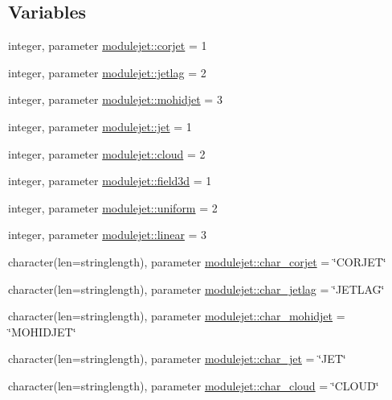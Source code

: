 \subsection*{Variables}
\begin{DoxyCompactItemize}
\item 
integer, parameter \mbox{\hyperlink{namespacemodulejet_a47f0eeeb3926639ae9bc14b922a7f57c}{modulejet\+::corjet}} = 1
\item 
integer, parameter \mbox{\hyperlink{namespacemodulejet_a0eac969bec0ab0471a9981f588069599}{modulejet\+::jetlag}} = 2
\item 
integer, parameter \mbox{\hyperlink{namespacemodulejet_a66d6965728ead70e0e7ec473e5f3892a}{modulejet\+::mohidjet}} = 3
\item 
integer, parameter \mbox{\hyperlink{namespacemodulejet_a40df7356ca4c8528a71bb58c601ebd49}{modulejet\+::jet}} = 1
\item 
integer, parameter \mbox{\hyperlink{namespacemodulejet_a9e881f4c022dfb8c88bf0a80253f418d}{modulejet\+::cloud}} = 2
\item 
integer, parameter \mbox{\hyperlink{namespacemodulejet_afc8a4f2043befe1347d4c124fa51f8fe}{modulejet\+::field3d}} = 1
\item 
integer, parameter \mbox{\hyperlink{namespacemodulejet_aded2b1f058efa2a87b81b1014237d1dd}{modulejet\+::uniform}} = 2
\item 
integer, parameter \mbox{\hyperlink{namespacemodulejet_a348a978ca201c1b1d5cce70caf9ffbca}{modulejet\+::linear}} = 3
\item 
character(len=stringlength), parameter \mbox{\hyperlink{namespacemodulejet_aaf2968de3c9e21de5bf36921280173ea}{modulejet\+::char\+\_\+corjet}} = \char`\"{}C\+O\+R\+J\+ET\char`\"{}
\item 
character(len=stringlength), parameter \mbox{\hyperlink{namespacemodulejet_a095e7e5dbe90a0743f6b20da582f4b36}{modulejet\+::char\+\_\+jetlag}} = \char`\"{}J\+E\+T\+L\+AG\char`\"{}
\item 
character(len=stringlength), parameter \mbox{\hyperlink{namespacemodulejet_a5d2a3c56461cb3ab743e4cf3e43ef5c4}{modulejet\+::char\+\_\+mohidjet}} = \char`\"{}M\+O\+H\+I\+D\+J\+ET\char`\"{}
\item 
character(len=stringlength), parameter \mbox{\hyperlink{namespacemodulejet_aefbc78bb0522ce92db2a8c9ebb93b89d}{modulejet\+::char\+\_\+jet}} = \char`\"{}J\+ET\char`\"{}
\item 
character(len=stringlength), parameter \mbox{\hyperlink{namespacemodulejet_ada08e627a6d079948c1b003fbb4123d3}{modulejet\+::char\+\_\+cloud}} = \char`\"{}C\+L\+O\+UD\char`\"{}

\end{DoxyCompactItemize}
